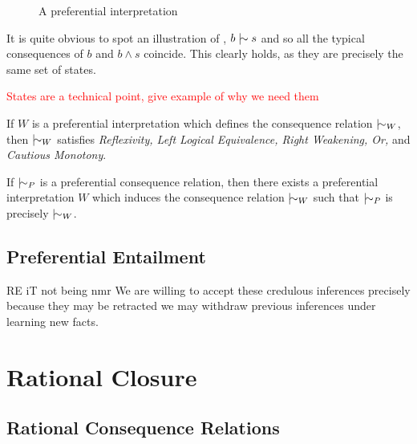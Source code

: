 \begin{example}
\begin{figure}[H]
    \caption{A preferential interpretation}
    \label{figure:preferential-interpretation}
  \end{figure}
  It is quite obvious to spot an illustration of , $b \twiddle s$ and so all the typical consequences of $b$ and
  $b \land s$ coincide. This clearly holds, as they are precisely the same set of states.
\end{example}

\textcolor{red}{States are a technical point, give example of why we need them}

\begin{theorem}[Soundness]
  \label{theorem:soundness-preferential} If $W$ is a preferential interpretation which defines the consequence relation $\twiddle_{W}$, then
  $\twiddle_{W}$ satisfies \textit{Reflexivity, Left Logical Equivalence, Right Weakening, Or,} and \textit{Cautious Monotony}.
\end{theorem}

\begin{theorem}[Completeness]
  \label{theorem:completeness-preferential} If $\twiddle_{P}$ is a preferential consequence relation, then there exists a preferential
  interpretation $W$ which induces the consequence relation $\twiddle_{W}$ such that $\twiddle_{P}$ is precisely $\twiddle_{W}$.
\end{theorem}

\subsection{Preferential Entailment}

RE iT not being nmr We are willing to accept these credulous inferences precisely because they may be retracted we may withdraw previous
inferences under learning new facts.

\section{Rational Closure}

\subsection{Rational Consequence Relations}